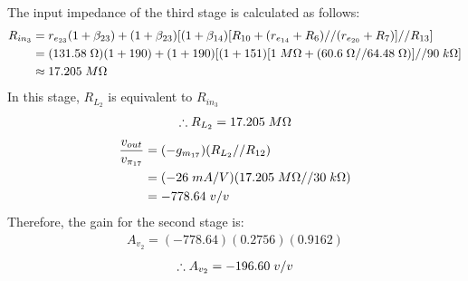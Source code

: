 \documentclass{article}
\begin{document}
	The input impedance of the third stage is calculated as follows:
	\begin{align*}
		R_{in_3} &= r_{e_{23}} (1 + \beta_{23}) + (1 + \beta_{23}) [(1 + \beta_{14})[R_{10} + (r_{e_{14}} + R_6) // (r_{e_{20}} + R_7)] // R_{13}]\\
		&= (131.58 \hspace{1mm} \Omega) (1 + 190) + (1 + 190) [(1 + 151)[1 \hspace{1mm} M\Omega + (60.6 \hspace{1mm} \Omega // 64.48 \hspace{1mm} \Omega)] // 90 \hspace{1mm} k\Omega]\\
		&\approx 17.205 \hspace{1mm} M\Omega
	\end{align*}
		In this stage, $R_{L_2}$ is equivalent to $R_{in_3}$
	\begin{align*}
		\therefore R_{L_2} =  17.205 \hspace{1mm} M\Omega
	\end{align*}
	\begin{align*}
		\frac{v_{out}}{v_{\pi_{17}}} &= (-g_{m_{17}}) (R_{L_2} // R_{12})\\
		&= (-26 \hspace{1mm} mA/V)(17.205 \hspace{1mm} M\Omega // 30 \hspace{1mm} k\Omega)\\
		&= -778.64 \hspace{1mm} v/v
	\end{align*}	
	Therefore, the gain for the second stage is:
	\begin{align*}
		A_{v_2} = (-778.64)(0.2756)(0.9162)
	\end{align*}
	\begin{align*}
		\therefore A_{v_2} = -196.60 \hspace{1mm} v/v
	\end{align*}
	
	\pagebreak
\end{document}

